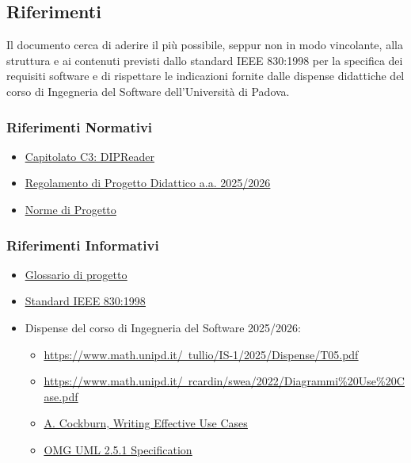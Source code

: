 \subsection{Riferimenti}
Il documento cerca di aderire il più possibile, seppur non in modo vincolante, alla struttura e ai contenuti previsti dallo standard IEEE 830:1998 per la specifica dei requisiti software e di rispettare le indicazioni fornite dalle dispense didattiche del corso di Ingegneria del Software dell'Università di Padova.

\subsubsection{Riferimenti Normativi}
\begin{itemize}
    \item \href{https://www.math.unipd.it/~tullio/IS-1/2025/Progetto/C3.pdf}{\ul{Capitolato C3: DIPReader}} 
    \item \href{https://www.math.unipd.it/~tullio/IS-1/2025/Dispense/PD1.pdf}{\ul{Regolamento di Progetto Didattico a.a. 2025/2026}} 
    \item \href{https://7-zpus.github.io/Docs/assets/2_RTB/DocumentiInterni/NormeDiProgetto.pdf}{\ul{Norme di Progetto}}
\end{itemize}

\subsubsection{Riferimenti Informativi}
\begin{itemize}
    \item \href{https://7-zpus.github.io/Docs/assets/2_RTB/DocumentiInterni/Glossario.pdf}{\ul{Glossario di progetto}}
    \item \href{https://ieeexplore.ieee.org/document/720574}{\ul{Standard IEEE 830:1998}} 
    \item Dispense del corso di Ingegneria del Software 2025/2026:
    \begin{itemize}
        \item \href{https://www.math.unipd.it/~tullio/IS-1/2025/Dispense/T05.pdf}{\ul{https://www.math.unipd.it/~tullio/IS-1/2025/Dispense/T05.pdf}} 
        \item \href{https://www.math.unipd.it/~rcardin/swea/2022/Diagrammi%20Use%20Case.pdf}{\ul{https://www.math.unipd.it/~rcardin/swea/2022/Diagrammi\%20Use\%20Case.pdf}\setulcolor{black}} 
        \item \href{https://kurzy.kpi.fei.tuke.sk/zsi/resources/CockburnBookDraft.pdf}{\ul{A. Cockburn, Writing Effective Use Cases}} 
        \item \href{https://www.omg.org/spec/UML/2.5.1/PDF}{\ul{OMG UML 2.5.1 Specification}} 
    \end{itemize}
\end{itemize}

